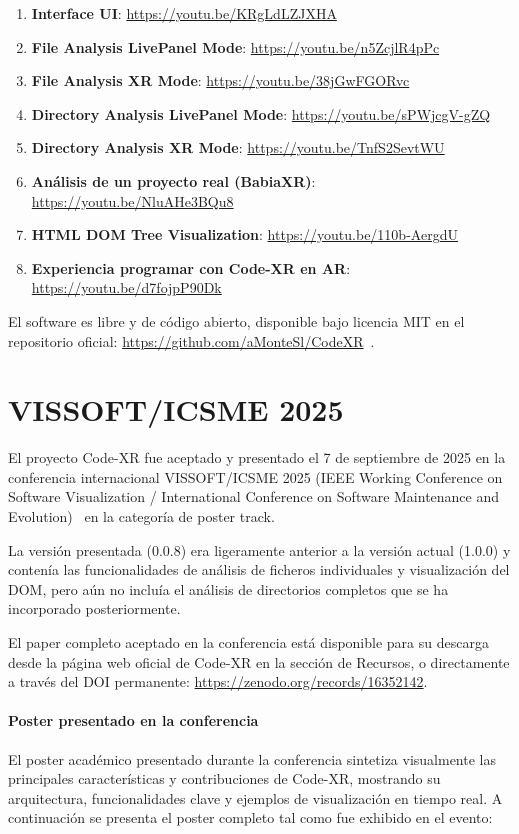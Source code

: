 \documentclass[a4paper, 12pt]{book}
\begin{document}
\begin{enumerate}
  \item \textbf{Interface UI}: \url{https://youtu.be/KRgLdLZJXHA}
  \item \textbf{File Analysis LivePanel Mode}: \url{https://youtu.be/n5ZcjlR4pPc}
  \item \textbf{File Analysis XR Mode}: \url{https://youtu.be/38jGwFGORvc}
  \item \textbf{Directory Analysis LivePanel Mode}: \url{https://youtu.be/sPWjcgV-gZQ}
  \item \textbf{Directory Analysis XR Mode}: \url{https://youtu.be/TnfS2SevtWU}
  \item \textbf{Análisis de un proyecto real (BabiaXR)}: \url{https://youtu.be/NluAHe3BQu8}
  \item \textbf{HTML DOM Tree Visualization}: \url{https://youtu.be/110b-AergdU}
  \item \textbf{Experiencia programar con Code-XR en AR}: \url{https://youtu.be/d7fojpP90Dk}
\end{enumerate}

El software es libre y de código abierto, disponible bajo licencia MIT en el repositorio oficial: \url{https://github.com/aMonteSl/CodeXR}~\cite{code-xr}.

\section{VISSOFT/ICSME 2025}
\label{sec:vissoft-icsme}

El proyecto Code-XR fue aceptado y presentado el 7 de septiembre de 2025 en la conferencia internacional VISSOFT/ICSME 2025  (IEEE Working Conference on Software Visualization / International Conference on Software Maintenance and Evolution)~\cite{vissoft2025} en la categoría de poster track.

La versión presentada (0.0.8) era ligeramente anterior a la versión actual (1.0.0) y contenía las funcionalidades de análisis de ficheros individuales y visualización del DOM, pero aún no incluía el análisis de directorios completos que se ha incorporado posteriormente.

El paper completo aceptado en la conferencia está disponible para su descarga desde la página web oficial de Code-XR en la sección de Recursos, o directamente a través del DOI permanente: \url{https://zenodo.org/records/16352142}.

\paragraph{Poster presentado en la conferencia}
El poster académico presentado durante la conferencia sintetiza visualmente las principales características y contribuciones de Code-XR, mostrando su arquitectura, funcionalidades clave y ejemplos de visualización en tiempo real. A continuación se presenta el poster completo tal como fue exhibido en el evento:
\end{document}
